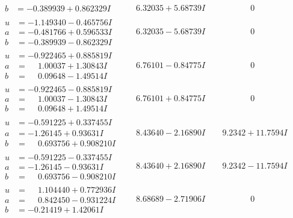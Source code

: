 \documentclass[1p]{elsarticle_modified}
\theoremstyle{definition}
\begin{document}
$$\begin{array}{c|c|c}
\begin{aligned}
b &= -0.389939 + 0.862329 I\end{aligned}
 & \phantom{-}6.32035 + 5.68739 I & \phantom{-0.000000 } 0 \\ \hline\begin{aligned}
u &= -1.149340 - 0.465756 I \\
a &= -0.481766 + 0.596533 I \\
b &= -0.389939 - 0.862329 I\end{aligned}
 & \phantom{-}6.32035 - 5.68739 I & \phantom{-0.000000 } 0 \\ \hline\begin{aligned}
u &= -0.922465 + 0.885819 I \\
a &= \phantom{-}1.00037 + 1.30843 I \\
b &= \phantom{-}0.09648 - 1.49514 I\end{aligned}
 & \phantom{-}6.76101 - 0.84775 I & \phantom{-0.000000 } 0 \\ \hline\begin{aligned}
u &= -0.922465 - 0.885819 I \\
a &= \phantom{-}1.00037 - 1.30843 I \\
b &= \phantom{-}0.09648 + 1.49514 I\end{aligned}
 & \phantom{-}6.76101 + 0.84775 I & \phantom{-0.000000 } 0 \\ \hline\begin{aligned}
u &= -0.591225 + 0.337455 I \\
a &= -1.26145 + 0.93631 I \\
b &= \phantom{-}0.693756 + 0.908210 I\end{aligned}
 & \phantom{-}8.43640 - 2.16890 I & \phantom{-}9.2342 + 11.7594 I \\ \hline\begin{aligned}
u &= -0.591225 - 0.337455 I \\
a &= -1.26145 - 0.93631 I \\
b &= \phantom{-}0.693756 - 0.908210 I\end{aligned}
 & \phantom{-}8.43640 + 2.16890 I & \phantom{-}9.2342 - 11.7594 I \\ \hline\begin{aligned}
u &= \phantom{-}1.104440 + 0.772936 I \\
a &= \phantom{-}0.842450 - 0.931224 I \\
b &= -0.21419 + 1.42061 I\end{aligned}
 & \phantom{-}8.68689 - 2.71906 I & \phantom{-0.000000 } 0 \\ \hline\begin{aligned}

\end{aligned}
\end{array}$$
\end{document}
